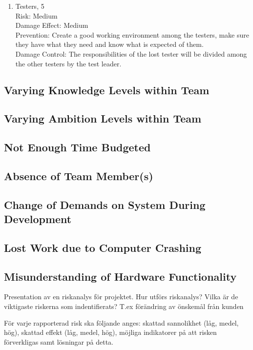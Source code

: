 \documentclass[a4paper]{article}
\begin{document}
\begin{enumerate}
\item Testers, 5\\
Risk: Medium\\
Damage Effect: Medium\\
Prevention: Create a good working environment among the testers, make sure they have what they need and know what is expected of them.\\
Damage Control: The responsibilities of the lost tester will be divided among the other testers by the test leader.
\end{enumerate}

\subsection{Varying Knowledge Levels within Team}

\subsection{Varying Ambition Levels within Team}

\subsection{Not Enough Time Budgeted}

\subsection{Absence of Team Member(s)}

\subsection{Change of Demands on System During Development}

\subsection{Lost Work due to Computer Crashing}

\subsection{Misunderstanding of Hardware Functionality}



Presentation av en riskanalys för projektet. Hur utförs riskanalys? Vilka är de viktigaste riskerna som indentifierats? T.ex förändring av önskemål från kunden

För varje rapporterad risk ska följande anges: skattad sannolikhet (låg, medel, hög), skattad effekt (låg, medel, hög), möjliga indikatorer på att risken förverkligas samt lösningar på detta.
\end{document}
